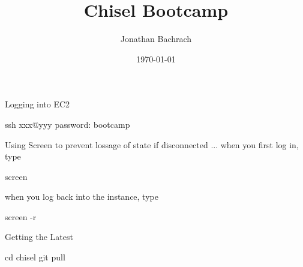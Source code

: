 \documentclass[xcolor=pdflatex,dvipsnames,table]{beamer}
\title{Chisel Bootcamp}
\author{Jonathan Bachrach}
\date{\today}
\institute[UC Berkeley]{EECS UC Berkeley}
\begin{document}
\begin{frame}
\titlepage
\end{frame}
\addtocounter{framenumber}{-1}

% 
% 
% 

\begin{frame}[fragile]{Logging into EC2}

\begin{scala}
ssh xxx@yyy
password: bootcamp
\end{scala}

\end{frame}

\begin{frame}[fragile]{Using Screen}
to prevent lossage of state if disconnected ... when you first log in, type
\begin{scala}
screen
\end{scala}

when you log back into the instance, type
\begin{scala}
screen -r
\end{scala}

\end{frame}

\begin{frame}[fragile]{Getting the Latest}

\begin{scala}
cd chisel
git pull
\end{scala}

\end{frame}
\end{document}

